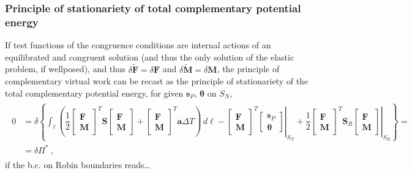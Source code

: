 \documentclass[letterpaper,10pt,english]{jupyterBook}
\begin{document}
\subsubsection{Principle of stationariety of total complementary potential energy}
\label{\detokenize{ch/solids/small-displacements-statics-beams-weak-form-general:principle-of-stationariety-of-total-complementary-potential-energy}}\label{\detokenize{ch/solids/small-displacements-statics-beams-weak-form-general:solid-mechanics-intro-small-displacements-statics-beam-weak-form-weak-stationariety-potential-complementary}}
\sphinxAtStartPar
If test functions of the congruence conditions are internal actions of an equilibrated and congruent solution (and thus the only solution of the elastic problem, if well\sphinxhyphen{}posed), and thus \(\delta \widetilde{\mathbf{F}} = \delta \mathbf{F}\) and \(\delta \widetilde{\mathbf{M}} = \delta \mathbf{M}\), the principle of complementary virtual work can be recast as the principle of stationariety of the total complementary potential energy, for given \(\mathbf{s}_P\), \(\boldsymbol\theta\) on \(S_N\),
\begin{equation*}
\begin{split}\begin{aligned}
  0 
  & = \delta \left\{ \int_{\ell} \left( \dfrac{1}{2} \begin{bmatrix} \mathbf{F} \\ \mathbf{M} \end{bmatrix}^T \mathbf{S} \begin{bmatrix} \mathbf{F} \\ \mathbf{M} \end{bmatrix} + \begin{bmatrix} \mathbf{F} \\ \mathbf{M} \end{bmatrix}^T \mathbf{a} \Delta T \right) \, d \ell - \left. \begin{bmatrix} \mathbf{F} \\ \mathbf{M} \end{bmatrix}^T \begin{bmatrix} \mathbf{s}_P \\ \boldsymbol{\theta} \end{bmatrix} \right|_{S_N} + \left.\dfrac{1}{2} \begin{bmatrix} \mathbf{F} \\ \mathbf{M} \end{bmatrix}^T \mathbf{S}_R \begin{bmatrix} \mathbf{F} \\ \mathbf{M} \end{bmatrix}\right|_{S_R} \right\} = \\
  & = \delta \Pi^* \ ,
\end{aligned}\end{split}
\end{equation*}
\sphinxAtStartPar
if the b.c. on Robin boundaries reads…
\end{document}
